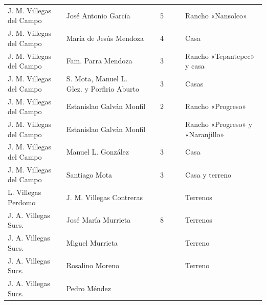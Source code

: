 \documentclass[14pt,twoside,final]{extbook} %
\begin{document}
{\begin{longtable}[c]{@{}p{2.5cm}lrSrrl@{}}
J. M. Villegas del Campo & José Antonio García &  & 5 &  &  & Rancho «Nansolco» \\
J. M. Villegas del Campo & María de Jesús Mendoza &  & 4 &  &  & Casa \\
J. M. Villegas del Campo & Fam. Parra Mendoza &  & 3 &  &  & Rancho «Tepantepec» y casa \\
J. M. Villegas del Campo & S. Mota, Manuel L. Glez. y Porfirio Aburto &  & 3 &  &  & Casas \\
J. M. Villegas del Campo & Estanislao Galván Monfil &  & 2 & {} & {} & Rancho «Progreso» \\
J. M. Villegas del Campo & Estanislao Galván Monfil &  & {} & {} & {} & Rancho «Progreso» y «Naranjillo» \\
J. M. Villegas del Campo & Manuel L. González &  & 3 &  &  & Casa \\
J. M. Villegas del Campo & Santiago Mota &  & 3 &  &  & Casa y terreno \\
L. Villegas Perdomo & J. M. Villegas Contreras &  & {} & {} & {} & Terrenos \\
J. A. Villegas Sucs. & José María Murrieta &  & 8 &  &  & Terrenos \\
J. A. Villegas Sucs. & Miguel Murrieta &  & {} & {} & {} & Terreno \\
J. A. Villegas Sucs. & Rosalino Moreno &  & {} & {} & {} & Terreno \\
J. A. Villegas Sucs. & Pedro Méndez &  & {} & {} & {} & {} \\

\end{longtable}}
\end{document}
